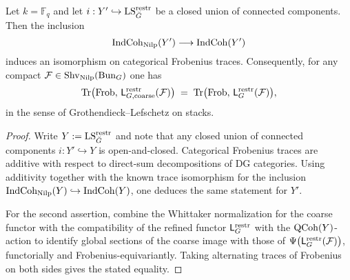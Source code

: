 \begin{theorem}\label{thm:trace-nilp-equality}
Let $k=\mathbb F_q$ and let $i:Y'\hookrightarrow \mathrm{LS}^{\mathrm{restr}}_{\breve G}$ be a closed union of connected components. Then the inclusion
\[
\mathrm{IndCoh}_{\mathrm{Nilp}}(Y')\longrightarrow \mathrm{IndCoh}(Y')
\]
induces an isomorphism on categorical Frobenius traces. Consequently, for any compact $\mathcal{F}\in\mathrm{Shv}_{\mathrm{Nilp}}(\mathrm{Bun}_G)$ one has
\[
\mathrm{Tr}\big(\mathrm{Frob},\,\mathsf L^{\mathrm{restr}}_{G,\mathrm{coarse}}(\mathcal{F})\big)
\;=\;\mathrm{Tr}\big(\mathrm{Frob},\,\mathsf L^{\mathrm{restr}}_G(\mathcal{F})\big),
\]
in the sense of Grothendieck--Lefschetz on stacks.
\end{theorem}

\begin{proof}
Write $Y:=\mathrm{LS}^{\mathrm{restr}}_{\breve G}$ and note that any closed union of connected components $i:Y'\hookrightarrow Y$ is open-and-closed. Categorical Frobenius traces are additive with respect to direct-sum decompositions of DG categories. Using additivity together with the known trace isomorphism for the inclusion $\mathrm{IndCoh}_{\mathrm{Nilp}}(Y)\hookrightarrow\mathrm{IndCoh}(Y)$, one deduces the same statement for $Y'$.

For the second assertion, combine the Whittaker normalization for the coarse functor with the compatibility of the refined functor $\mathsf L^{\mathrm{restr}}_G$ with the $\mathrm{QCoh}(Y)$-action to identify global sections of the coarse image with those of $\Psi\big(\mathsf L^{\mathrm{restr}}_G(\mathcal{F})\big)$, functorially and Frobenius-equivariantly. Taking alternating traces of Frobenius on both sides gives the stated equality.
\end{proof}

